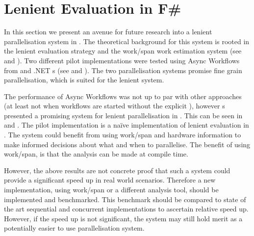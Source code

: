 \section{Lenient Evaluation in F\#}
In this section we present an avenue for future research into a lenient parallelisation system in \fs. The theoretical background for this system is rooted in the lenient evaluation strategy and the work/span work estimation system (see  and ). Two different pilot implementations were tested using Async Workflows from \fs and .NET s (see  and ). The two parallelisation systems promise fine grain parallelisation, which is suited for the lenient system.

The performance of Async Workflows was not up to par with other approaches (at least not when workflows are started without the explicit ), however s presented a promising system for lenient parallelisation in \fs. This can be seen in  and . The pilot implementation is a naïve implementation of lenient evaluation in \fs. The system could benefit from using work/span and hardware information to make informed decisions about what and when to parallelise. The benefit of using work/span, is that the analysis can be made at compile time.

However, the above results are not concrete proof that such a system could provide a significant speed up in real world scenarios. Therefore a new implementation, using work/span or a different analysis tool, should be implemented and benchmarked. This benchmark should be compared to state of the art sequential and concurrent implementations to ascertain relative speed up. However, if the speed up is not significant, the system may still hold merit as a potentially easier to use parallelisation system.
